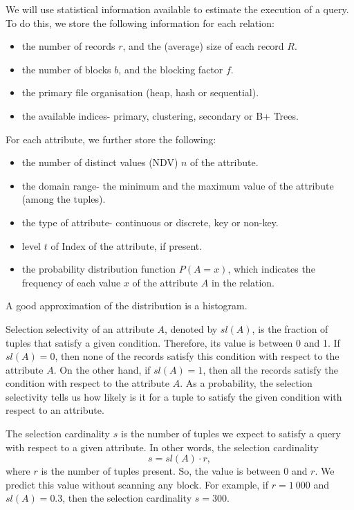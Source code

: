 \documentclass[a4paper, openany]{memoir}
\theoremstyle{definition}
\theoremstyle{plain}
\begin{document}
We will use statistical information available to estimate the execution of a query. To do this, we store the following information for each relation:
\begin{itemize}
    \item the number of records $r$, and the (average) size of each record $R$.
    \item the number of blocks $b$, and the blocking factor $f$.
    \item the primary file organisation (heap, hash or sequential).
    \item the available indices- primary, clustering, secondary or B+ Trees.
\end{itemize}
For each attribute, we further store the following:
\begin{itemize}
    \item the number of distinct values (NDV) $n$ of the attribute.
    \item the domain range- the minimum and the maximum value of the attribute (among the tuples).
    \item the type of attribute- continuous or discrete, key or non-key.
    \item level $t$ of Index of the attribute, if present.
    \item the probability distribution function $P(A = x)$, which indicates the frequency of each value $x$ of the attribute $A$ in the relation.
\end{itemize}
A good approximation of the distribution is a histogram.

Selection selectivity of an attribute $A$, denoted by $\textit{sl}(A)$, is the fraction of tuples that satisfy a given condition. Therefore, its value is between 0 and 1. If $\textit{sl}(A) = 0$, then none of the records satisfy this condition with respect to the attribute $A$. On the other hand, if $\textit{sl}(A) = 1$, then all the records satisfy the condition with respect to the attribute $A$. As a probability, the selection selectivity tells us how likely is it for a tuple to satisfy the given condition with respect to an attribute.

The selection cardinality $s$ is the number of tuples we expect to satisfy a query with respect to a given attribute. In other words, the selection cardinality
\[s = \textit{sl}(A) \cdot r,\]
where $r$ is the number of tuples present. So, the value is between 0 and $r$. We predict this value without scanning any block. For example, if $r = 1 \ 000$ and $\textit{sl}(A) = 0.3$, then the selection cardinality $s = 300$. 
\end{document}
